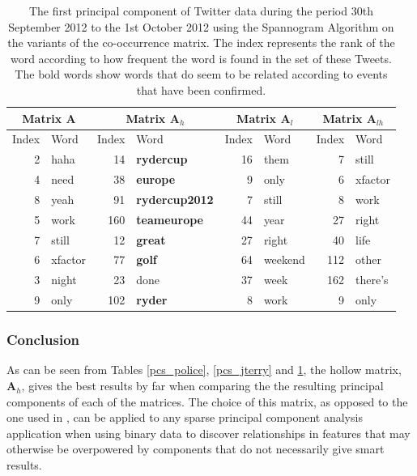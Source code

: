 \documentclass[11pt,a4paper]{article}
\newcommand{\covmat}{\mathbf{A}}
\begin{document}
\begin{table}[H]
\center
\begin{tabular}{| r | l | r | l| r | l | r | l|}
\hline
\multicolumn{2}{|c|}{Matrix $\covmat$ }& \multicolumn{2}{|c|}{Matrix $\covmat_h$}& \multicolumn{2}{|c|}{Matrix $\covmat_l$} & \multicolumn{2}{|c|}{Matrix $\covmat_{lh}$} \\

\hline
Index & Word &Index & Word & Index & Word & Index & Word\\
\hline
2 & haha & 14 & \textbf{rydercup} & 16 & them& 7 & still\\
4 & need  & 38 & \textbf{europe} & 9 & only &  6 & xfactor\\
8 & yeah &91 & \textbf{rydercup2012}& 7 & still  & 8 & work \\

5 & work & 160 & \textbf{teameurope}&44 & year  & 27 & right \\

7 & still &  12 & \textbf{great}&27 & right   & 40 & life\\

6 & xfactor & 77 & \textbf{golf}  &64& weekend & 112 & other  \\ 

3 & night &23 & done & 37 & week & 162 & there's\\
 
9 & only & 102 & \textbf{ryder}  & 8 & work & 9 & only\\

\hline
\end{tabular}
\label{pcs_ryder}
\caption{The first principal component of Twitter data during the period 30th September 2012 to the 1st October 2012 using the Spannogram Algorithm on the variants of the co-occurrence matrix. The index represents the rank of the word according to how frequent the word is found in the set of these Tweets. The bold words show words that do seem to be related according to events that have been confirmed.}
\end{table}

\subsubsection*{Conclusion}
As can be seen from Tables \ref{pcs_police}, \ref{pcs_jterry} and \ref{pcs_ryder}, the hollow matrix, $\covmat_h$, gives the best results by far when comparing the the resulting principal components of each of the matrices. The choice of this matrix, as opposed to the one used in \cite{dimakis}, can be applied to any sparse principal component analysis application when using binary data to discover relationships in features that may otherwise be overpowered by components that do not necessarily give smart results. 
\end{document}
